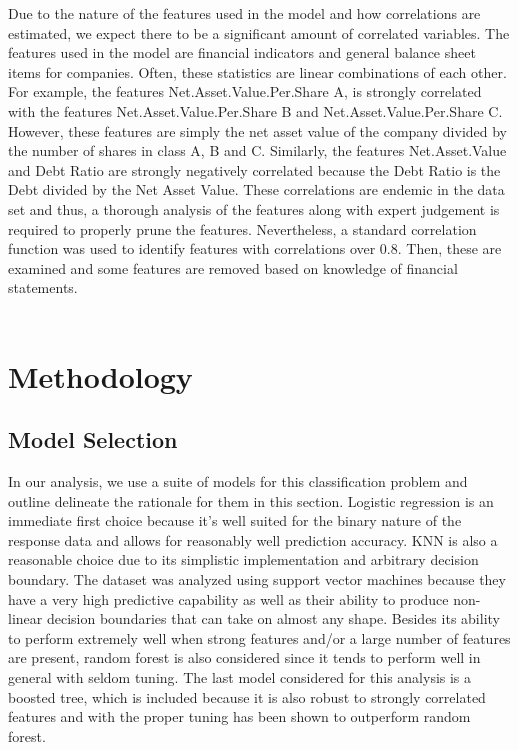 \documentclass[12pt]{report}
\begin{document}
Due to the nature of the features used in the model and how correlations are estimated, we expect there to be a significant amount of correlated variables. The features used in the model are financial indicators and general balance sheet items for companies. Often, these statistics are linear combinations of each other. For example, the features Net.Asset.Value.Per.Share A, is strongly correlated with the features Net.Asset.Value.Per.Share B and Net.Asset.Value.Per.Share C. However, these features are simply the net asset value of the company divided by the number of shares in class A, B and C. Similarly, the features Net.Asset.Value and Debt Ratio are strongly negatively correlated because the Debt Ratio is the Debt divided by the Net Asset Value. These correlations are endemic in the data set and thus, a thorough analysis of the features along with expert judgement is required to properly prune the features. Nevertheless, a standard correlation function was used to identify features with correlations over 0.8. Then, these are examined and some features are removed based on knowledge of financial statements. \\ %
 \\%




\begingroup
\renewcommand{\cleardoublepage}{}
\renewcommand{\clearpage}{}

\chapter{Methodology} %
\endgroup

\section{Model Selection}

In our analysis, we use a suite of models for this classification problem and outline delineate the rationale for them in this section. Logistic regression is an immediate first choice because it's well suited for the binary nature of the response data and allows for reasonably well prediction accuracy. KNN is also a reasonable choice due to its simplistic implementation and arbitrary decision boundary. The dataset was analyzed using support vector machines because they have a very high predictive capability as well as their ability to produce non-linear decision boundaries that can take on almost any shape. Besides its ability to perform extremely well when strong features and/or a large number of features are present, random forest is also considered since it tends to perform well in general with seldom tuning. The last model considered for this analysis is a boosted tree, which is included because it is also robust to strongly correlated features and with the proper tuning has been shown to outperform random forest. 
\end{document}
